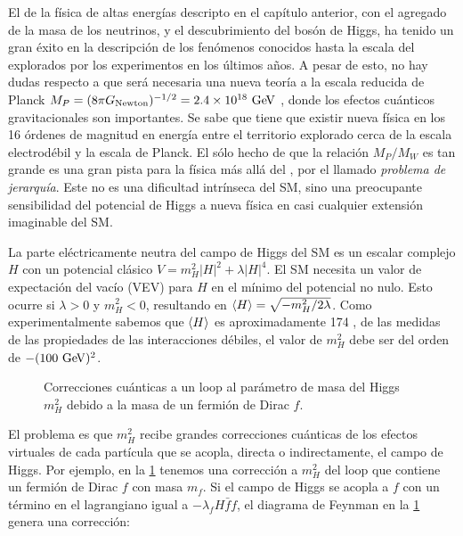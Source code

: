 El {\SM} de la física de altas energías descripto en el capítulo anterior, con
el agregado de la masa de los neutrinos, y el descubrimiento del bosón de Higgs,
ha tenido un gran éxito en la descripción de los fenómenos conocidos hasta la
escala del {\tev} explorados por los experimentos en los últimos a\~nos.
A pesar de esto, no hay dudas respecto a que será necesaria una nueva teoría
a la escala reducida de Planck $M_P = (8\pi G_\text{Newton})^{-1/2} = 2.4 \times
10^{18} \gev$ , donde los efectos cuánticos gravitacionales son importantes.
Se sabe que tiene que existir nueva física en los 16 órdenes de magnitud en
energía entre el territorio explorado cerca de la escala electrodébil y la
escala de Planck. El sólo hecho de que la relación $M_P/M_W$ es tan grande es
una gran pista para la física más allá del {\SM}, por el llamado \emph{problema
  de jerarquía}. Este no es una dificultad intrínseca del SM, sino una
preocupante sensibilidad del potencial de Higgs a nueva física en casi cualquier
extensión imaginable del SM.

La parte eléctricamente neutra del campo de Higgs del SM es un escalar complejo
$H$ con un potencial clásico $V=m_H^2 |H|^2 + \lambda|H|^4$. El SM necesita un
valor de expectación del vacío (VEV) para $H$ en el mínimo del potencial no
nulo. Esto ocurre si $\lambda>0$ y $m_H^2<0$, resultando en $\langle H \rangle =
\sqrt{-m_H^2/2\lambda}$. Como experimentalmente sabemos que $\langle H \rangle$ es
aproximadamente 174 \gev, de las medidas de las propiedades de las interacciones
débiles, el valor de $m_H^2$ debe ser del orden de $-(100 \gev)^2$.

\begin{figure}[!htbp]
  \centering 
  \caption{Correcciones cuánticas a un loop al parámetro de masa del Higgs
    $m_H^2$ debido a la masa de un fermión de Dirac $f$.}
  \label{fig:higgs_correction_f}
\end{figure}

El problema es que $m_H^2$ recibe grandes correcciones cuánticas de los efectos
virtuales de cada partícula que se acopla, directa o indirectamente, el
campo de Higgs. Por ejemplo, en la \cref{fig:higgs_correction_f} tenemos una
corrección a $m_H^2$ del loop que contiene un fermión de Dirac $f$ con masa
$m_f$. Si el campo de Higgs se acopla a $f$ con un término en el lagrangiano
igual a $-\lambda_f H \bar{f}f$, el diagrama de Feynman en la
\cref{fig:higgs_correction_f} genera una corrección:

